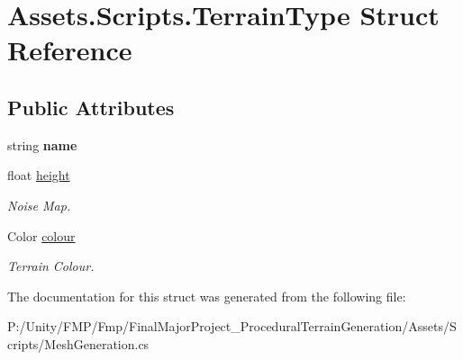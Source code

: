 \hypertarget{struct_assets_1_1_scripts_1_1_terrain_type}{}\section{Assets.\+Scripts.\+Terrain\+Type Struct Reference}
\label{struct_assets_1_1_scripts_1_1_terrain_type}
\subsection*{Public Attributes}
\begin{DoxyCompactItemize}
\item 
\mbox{\label{struct_assets_1_1_scripts_1_1_terrain_type_adc85900e51a9c3cbd07bee4864c73835}} 
string {\bfseries name}
\item 
\mbox{\label{struct_assets_1_1_scripts_1_1_terrain_type_ae407f9e1692c858039720d218efe2ccb}} 
float \mbox{\hyperlink{struct_assets_1_1_scripts_1_1_terrain_type_ae407f9e1692c858039720d218efe2ccb}{height}}
\begin{DoxyCompactList}\small\item\em Noise Map. \end{DoxyCompactList}\item 
\mbox{\label{struct_assets_1_1_scripts_1_1_terrain_type_acfa9d0c3f1c1b60c182123f99aef103f}} 
Color \mbox{\hyperlink{struct_assets_1_1_scripts_1_1_terrain_type_acfa9d0c3f1c1b60c182123f99aef103f}{colour}}
\begin{DoxyCompactList}\small\item\em Terrain Colour. \end{DoxyCompactList}\end{DoxyCompactItemize}


The documentation for this struct was generated from the following file\+:\begin{DoxyCompactItemize}
\item 
P\+:/\+Unity/\+F\+M\+P/\+Fmp/\+Final\+Major\+Project\+\_\+\+Procedural\+Terrain\+Generation/\+Assets/\+Scripts/Mesh\+Generation.\+cs\end{DoxyCompactItemize}
